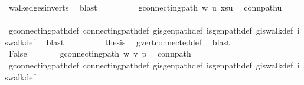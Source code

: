 \begin{isabellebody}
\ walk{\isacharunderscore}{\kern0pt}edges{\isacharunderscore}{\kern0pt}in{\isacharunderscore}{\kern0pt}verts\ \isamarkupfalse%
\ blast\isanewline
\ \ \ \ \ \ \isamarkupfalse%
\ \isamarkupfalse%
\ {\isachardoublequoteopen}g{\isacharprime}{\kern0pt}{\isachardot}{\kern0pt}connecting{\isacharunderscore}{\kern0pt}path\ w\ u\ {\isacharparenleft}{\kern0pt}xs{\isacharat}{\kern0pt}{\isacharbrackleft}{\kern0pt}u{\isacharbrackright}{\kern0pt}{\isacharparenright}{\kern0pt}{\isachardoublequoteclose}\ \isamarkupfalse%
\ conn{\isacharunderscore}{\kern0pt}path{\isacharunderscore}{\kern0pt}u\isanewline
\ \ \ \ \ \ \ \ \isamarkupfalse%
\ g{\isacharprime}{\kern0pt}{\isachardot}{\kern0pt}connecting{\isacharunderscore}{\kern0pt}path{\isacharunderscore}{\kern0pt}def\ connecting{\isacharunderscore}{\kern0pt}path{\isacharunderscore}{\kern0pt}def\ g{\isacharprime}{\kern0pt}{\isachardot}{\kern0pt}is{\isacharunderscore}{\kern0pt}gen{\isacharunderscore}{\kern0pt}path{\isacharunderscore}{\kern0pt}def\ is{\isacharunderscore}{\kern0pt}gen{\isacharunderscore}{\kern0pt}path{\isacharunderscore}{\kern0pt}def\ g{\isacharprime}{\kern0pt}{\isachardot}{\kern0pt}is{\isacharunderscore}{\kern0pt}walk{\isacharunderscore}{\kern0pt}def\ is{\isacharunderscore}{\kern0pt}walk{\isacharunderscore}{\kern0pt}def\ \isamarkupfalse%
\ blast\isanewline
\ \ \ \ \ \ \isamarkupfalse%
\ \isamarkupfalse%
\ {\isacharquery}{\kern0pt}thesis\ \isamarkupfalse%
\ g{\isacharprime}{\kern0pt}{\isachardot}{\kern0pt}vert{\isacharunderscore}{\kern0pt}connected{\isacharunderscore}{\kern0pt}def\ \isamarkupfalse%
\ blast\isanewline
\ \ \ \ \isamarkupfalse%
\isanewline
\ \ \isamarkupfalse%
\isanewline
\ \ \ \ \isamarkupfalse%
\ False\isanewline
\ \ \ \ \isamarkupfalse%
\ \isamarkupfalse%
\ {\isachardoublequoteopen}g{\isacharprime}{\kern0pt}{\isachardot}{\kern0pt}connecting{\isacharunderscore}{\kern0pt}path\ w\ v\ p{\isachardoublequoteclose}\ \isamarkupfalse%
\ conn{\isacharunderscore}{\kern0pt}path\isanewline
\ \ \ \ \ \ \isamarkupfalse%
\ g{\isacharprime}{\kern0pt}{\isachardot}{\kern0pt}connecting{\isacharunderscore}{\kern0pt}path{\isacharunderscore}{\kern0pt}def\ connecting{\isacharunderscore}{\kern0pt}path{\isacharunderscore}{\kern0pt}def\ g{\isacharprime}{\kern0pt}{\isachardot}{\kern0pt}is{\isacharunderscore}{\kern0pt}gen{\isacharunderscore}{\kern0pt}path{\isacharunderscore}{\kern0pt}def\ is{\isacharunderscore}{\kern0pt}gen{\isacharunderscore}{\kern0pt}path{\isacharunderscore}{\kern0pt}def\ g{\isacharprime}{\kern0pt}{\isachardot}{\kern0pt}is{\isacharunderscore}{\kern0pt}walk{\isacharunderscore}{\kern0pt}def\ is{\isacharunderscore}{\kern0pt}walk{\isacharunderscore}{\kern0pt}def\ \isamarkupfalse%

\end{isabellebody}
